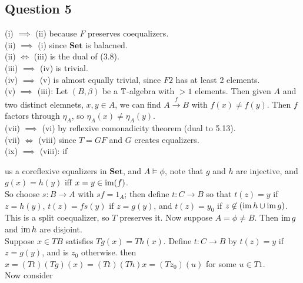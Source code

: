 \documentclass[a4paper]{article}
\begin{document}
\subsection{Question 5}
(i) $\implies$ (ii) because $F$ preserves coequalizers.\\
(ii) $\implies$ (i) since $\mathbf{Set}$ is balacned.\\
(ii) $\iff$ (iii) is the dual of (3.8).\\
(iii) $\implies$ (iv) is trivial.\\
(iv) $\implies$ (v) is almost equally trivial, since $F2$ has at least 2 elements.\\
(v) $\implies$ (iii): Let $(B,\beta)$ be a $\mathbb{T}$-algebra with $>1$ elements. Then given $A$ and two distinct elemnets, $x,y \in A$, we can find $A \xrightarrow{f} B$ with $f(x) \neq f(y)$. Then $f$ factors through $\eta_A$, so $\eta_A(x) \neq \eta_A(y)$.\\
(vii) $\implies$ (vi) by reflexive comonadicity theorem (dual to 5.13).\\
(vii) $\iff$ (viii) since $T=GF$ and $G$ creates equalizers.\\
(ix) $\implies$ (viii): if 
us a coreflexive equalizers in $\mathbf{Set}$, and $A \vDash \phi$, note that $g$ and $h$ are injective, and $g(x) = h(y)$ iff $x=y \in \operatorname{im}(f)$.\\
So choose $s:B \to A$ with $sf = 1_A$; then define $t:C \to B$ so that $t(z) = y$ if $z=h(y)$, $t(z) = fs(y)$ if $z=g(y)$, and $t(z) = y_0$ if $z \not\in (\operatorname{im} h \cup \operatorname{im} g)$.\\
This is a split coequalizer, so $T$ preserves it. Now suppose $A = \phi \neq B$. Then $\operatorname{im} g$ and $\operatorname{im} h$ are disjoint.\\
Suppose $x \in TB$ satisfies $Tg(x) = Th(x)$. Define $t:C \to B$ by $t(z) = y$ if $z=g(y)$, and is $z_0$ otherwise. then $x = (Tt)(Tg)(x) = (Tt)(Th)x = (Tz_0)(u)$ for some $u \in T1$.\\
Now consider 

\end{document}
